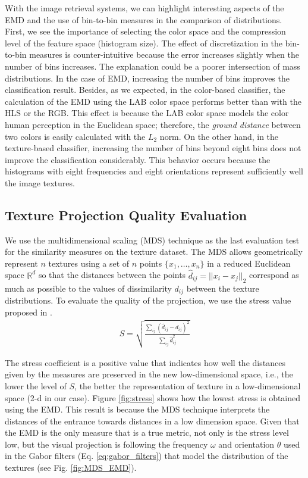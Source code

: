 With the image retrieval systems, we can highlight interesting aspects of the EMD and the use of bin-to-bin measures in the comparison of distributions. First, we see the importance of selecting the color space and the compression level of the feature space (histogram size). The effect of discretization in the bin-to-bin measures is counter-intuitive because the error increases slightly when the number of bins increases. The explanation could be a poorer intersection of mass distributions. In the case of EMD, increasing the number of bins improves the classification result. Besides, as we expected, in the color-based classifier, the calculation of the EMD using the LAB color space performs better than with the HLS or the RGB. This effect is because the LAB color space models the color human perception in the Euclidean space; therefore, the \textit{ground distance} between two colors is easily calculated with the $L_2$ norm. On the other hand, in the texture-based classifier, increasing the number of bins beyond eight bins does not improve the classification considerably. This behavior occurs because the histograms with eight frequencies and eight orientations represent sufficiently well the image textures.

\subsection{Texture Projection Quality Evaluation} \label{subsec:mds}

We use the multidimensional scaling (MDS) technique \citep{Kruskal:Psycho:1964} as the last evaluation test for the similarity measures on the texture dataset. The MDS allows geometrically represent $n$ textures using a set of $n$ points $\{x_1, \ldots, x_n\}$ in a reduced Euclidean space $\mathbb{R}^{d}$ so that the distances between the points $\hat{d}_{ij} = ||x_i-x_j||_2$ correspond as much as possible to the values of dissimilarity $d_{ij}$ between the texture distributions. To evaluate the quality of the projection, we use the stress value proposed in \citep{Kruskal:Psycho:1964}.
\begin{eqnarray}
S= \sqrt{\frac{\sum_{ij}(\hat{d}_{ij}-d_{ij})^2}{\sum_{ij}\hat{d}_{ij}^2}}
\label{eq:stress}
\end{eqnarray}

The stress coefficient is a positive value that indicates how well the distances given by the measures are preserved in the new low-dimensional space, i.e., the lower the level of $S$, the better the representation of texture in a low-dimensional space (2-d in our case). Figure \ref{fig:stress} shows how the lowest stress is obtained using the EMD. This result is because the MDS technique interprets the distances of the entrance towards distances in a low dimension space. Given that the EMD is the only measure that is a true metric, not only is the stress level low, but the visual projection is following the frequency $\omega$ and orientation $\theta$ used in the Gabor filters (Eq. \eqref{eq:gabor_filters}) that model the distribution of the textures (see Fig. \ref{fig:MDS_EMD}). %

